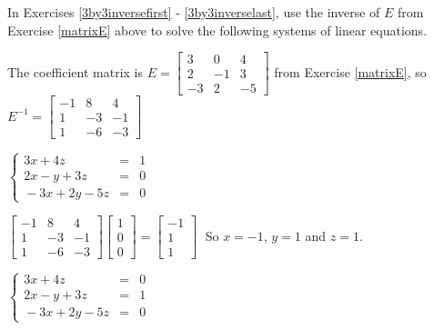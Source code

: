 \documentclass{ximera}
\begin{document}
\begin{question}
In Exercises \ref{3by3inversefirst} - \ref{3by3inverselast}, use the inverse of $E$ from Exercise \ref{matrixE} above to solve the following systems of linear equations.

\begin{hint}
The coefficient matrix is $E = \left[ \begin{array}{rrr} 3 & 0 & 4 \\ 2 & -1 & 3 \\ -3 & 2 & -5 \end{array} \right]$ from Exercise \ref{matrixE}, so $E^{-1} = \left[ \begin{array}{rrr} -1 & 8 & 4 \\ 1 & -3 & -1 \\ 1 & -6 & -3 \end{array} \right]$
\end{hint}

\begin{problem}\label{3by3inversefirst}
$\left\{ \begin{array}{rcr}   3x + 4z & = & 1 \\ 2x - y + 3z & = & 0 \\ \!-3x + 2y - 5z & = & 0  \end{array} \right.$

\begin{solution}
$\left[ \begin{array}{rrr} -1 & 8 & 4 \\ 1 & -3 & -1 \\ 1 & -6 & -3 \end{array} \right] \left[ \begin{array}{r} 1 \\ 0 \\ 0 \end{array} \right] = \left[ \begin{array}{r} -1 \\ 1 \\ 1 \end{array} \right] \;$ So $x = -1$, $y = 1$ and $z = 1$.
\end{solution}
\end{problem}

\begin{problem}
$\left\{ \begin{array}{rcr}   3x + 4z & = & 0 \\ 2x - y + 3z & = & 1 \\ \!-3x + 2y - 5z & = & 0  \end{array} \right.$


\end{problem}
\end{question}
\end{document}
